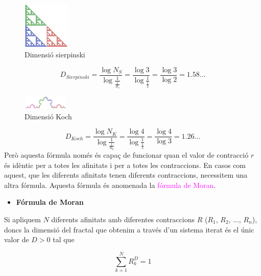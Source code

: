 \documentclass[12pt]{report}
\begin{document}
\begin{figure}
    \includegraphics[width=0.2\textwidth]{DimS.PNG}
    \caption{Dimensió sierpinski}
    \end{figure}
$$D_{Sierpinski} = \frac{ \log{N_S}}{\log{\frac{1}{\frac{1}{R_s}}}}= \frac{ \log{3}}{\log{\frac{1}{\frac{1}{2}}}}= \frac{\log{3}}{\log{2}} = 1.58 ...$$
\newline
\newline
\newline
\newline
\newline

\begin{figure}
    \includegraphics[width=0.2\textwidth]{DimK.PNG}
    \caption{Dimensió Koch}
    \end{figure}
$$D_{Koch} = \frac{ \log{N_K}}{\log{\frac{1}{\frac{1}{R_k}}}} = \frac{ \log{4}}{\log{\frac{1}{\frac{1}{3}}}}= \frac{\log{4}}{\log{3}} = 1.26 ...$$
\newline
\newline
\newline
Però aquesta fórmula només és capaç de funcionar quan el valor de contracció $r$ és idèntic per a totes les afinitats i per a totes les contraccions.
\newline
En casos com aquest, que les diferents afinitats tenen diferents contraccions, necessitem una altra fórmula. Aquesta fórmula és anomenada la  \textcolor{magenta}{fórmula de Moran}.

\begin{itemize}
\item \textbf{Fórmula de Moran}
\end{itemize}
Si apliquem $N$ diferents afinitats amb diferentes contraccions $R$ ($R_1$, $R_2$, ..., $R_n$), doncs la dimensió del fractal que obtenim a través d'un sistema iterat és el únic valor de $D > 0$ tal que

$$\sum\limits_{k=1}^{N}R^D_k=1$$
\end{document}
